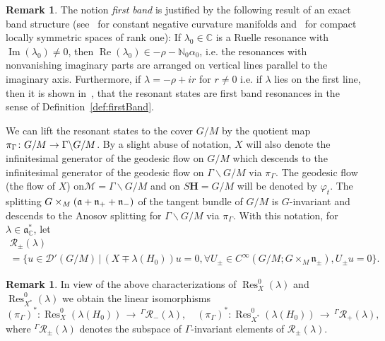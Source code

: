 \documentclass[10pt]{amsart}
\theoremstyle{definition}
\newtheorem{rema}[cdrthm]{Remark}
\DeclareMathOperator{\Res}{Res}
\DeclareMathOperator{\Imag}{Im}
\DeclareMathOperator{\Real}{Re}
\newcommand{\mc}{\mathcal}
\newcommand{\cc}{\mathbb{C}}
\newcommand{\bfh}{\mathbf{H}}
\newcommand{\N}{\mathbb{N}}
\renewcommand{\a}{\mathfrak a}
\let\oldforall\forall
\renewcommand*{\forall}{\mathrel{\oldforall}}
\begin{document}
\begin{rema}
The notion \emph{first band} is justified by the following result of an exact band structure (see~\cite{DFG15} for constant negative curvature manifolds and~\cite{KW19a} for compact locally symmetric spaces of rank one): If $\lambda_0\in \cc$ is a Ruelle resonance with $\Imag(\lambda_0)\neq 0$, then $\Real(\lambda_0) \in -\rho - \N_0\alpha_0$, i.e. the resonances with nonvanishing imaginary parts are arranged on vertical lines parallel to the imaginary axis. Furthermore, if $\lambda= -\rho + ir$ for $r\neq 0$ i.e. if $\lambda$ lies on the first line, then it is shown in~\cite{DFG15,KW19a}, that the resonant states are first band resonances in the sense of Definition~\ref{def:firstBand}.
\end{rema}

We can lift the resonant states to the cover $G/M$ by the quotient map $\pi_{\Gamma}\colon G/M\linebreak\to \Gamma\backslash G/M$. By a slight abuse of notation, $X$ will also denote the infinitesimal generator of the geodesic flow on $G/M$ which descends to the infinitesimal generator of the geodesic flow on $\Gamma\backslash G/M$ via $\pi_{\Gamma}$. The geodesic flow (the flow of $X$) on\linebreak$\mc{M}=\Gamma\backslash G/M$ and on $S{\bfh}=G/M$ will be denoted by $\varphi_t$. The splitting $G\times_M\linebreak(\mathfrak a +\mathfrak n_+ +\mathfrak n_-)$ of the tangent bundle of $G/M$ is $G$-invariant and descends to the Anosov splitting for $\Gamma\backslash G/M$ via $\pi_{\Gamma}$. With this notation, for $\lambda\in\a^*_\cc$, let
\begin{multline*}
\mc{R}_\pm(\lambda)\\
 = \big\{u\in \mathcal D'(G/M)\,\big| \, (X\mp \lambda(H_0))u=0,
\forall U_\pm \in C^\infty(G/M;G\times_M \mathfrak n_\pm), U_\pm u =0\big\}.
\end{multline*}

\begin{rema}\label{lem:firs_band_Gamma_inv_vectors}
In view of the above characterizations of $\Res^0_{X}(\lambda)$ and $\Res^0_{X^*}(\lambda)$ we obtain the linear isomorphisms
\[
(\pi_{\Gamma})^*:\Res_{X}^0(\lambda(H_0))\,\to\,{^\Gamma \mc{R}_-(\lambda)}, \quad (\pi_{\Gamma})^*:\Res_{X^*}^0(\lambda(H_0))\,\to\,{^\Gamma \mc{R}_+(\lambda)},
\]
where $^\Gamma \mc{R}_\pm(\lambda)$ denotes the subspace of $\Gamma$-invariant elements of $\mc{R}_\pm(\lambda)$.
\end{rema}
\end{document}
